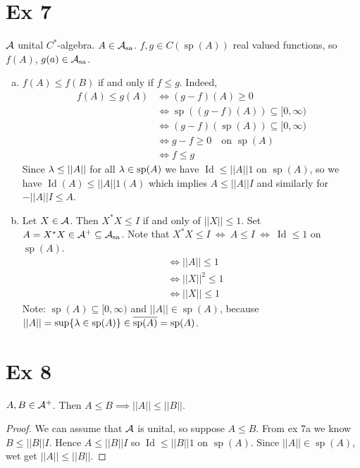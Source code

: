 \documentclass[10pt,english,a4paper]{article}
\theoremstyle{definition}
\def\Assa{\As_{\text{sa}}}
\DeclareMathOperator{\Id}{Id}
\DeclareMathOperator{\Sp}{sp}
\begin{document}
\section*{Ex 7}
$\mathcal{A}$ unital $C^*$-algebra. $A \in \Assa$. $f,g \in C(\Sp(A))$ real valued functions,
so $f(A)$, $g(a) \in \Assa$.

\begin{enumerate}[(a)]
    \item 
$f(A) \leq f(B)$ if and only if $f \leq g$.
Indeed, 
\begin{align*}
    f(A) \leq g(A) &\iff (g-f)(A)\geq 0 \\
    &\iff \Sp((g-f)(A)) \subseteq [0,\infty) \\
    &\iff (g-f)(\Sp(A)) \subseteq [0,\infty) \\
    &\iff g-f \geq 0 \quad \text{on }\Sp(A) \\
    &\iff f \leq g
\end{align*}
Since $\lambda \leq ||A||$ for all $\la \in \Sp(A)$ we have $\Id \leq ||A||1$ on $\Sp(A)$,
so we have 
$\Id(A) \leq ||A|| 1(A) $ which implies $A \leq ||A|| I$ and similarly for
$-||A|| I \leq A$.

\item Let $X \in \mathcal{A}$. Then $X^*X \leq I$ if and only of $||X||\leq 1$. Set 
$A = X^*X \in \As^+ \subseteq \Assa$. Note that 
$X^*X \leq I ~\iff ~ A \leq I ~ \iff ~ \Id \leq 1$ on $\Sp(A)$.
\begin{align*}
    &\iff ||A|| \leq 1 \\
    &\iff ||X||^2 \leq 1 \\
    &\iff ||X|| \leq 1
\end{align*}
Note: $\Sp(A) \subseteq [0,\infty)$ and $||A|| \in \Sp(A)$, because 
$||A|| = \sup\{ \la \in \Sp(A) \} \in \ol{\Sp(A)} = \Sp(A)$.

\end{enumerate}

\section*{Ex 8}
$A,B \in \mathcal{A}^+$. Then $A \leq B \implies ||A||\leq ||B||$.
\begin{proof}
    We can assume that $\mathcal{A}$ is unital, so suppose $A \leq B$.
    From ex 7a we know $B \leq ||B|| I$. Hence $A\leq ||B||I$ so 
    $\Id \leq ||B|| 1$ on $\Sp(A)$. Since $||A|| \in \Sp(A)$, wet get $||A||
    \leq ||B||$. 
\end{proof}
\end{document}
